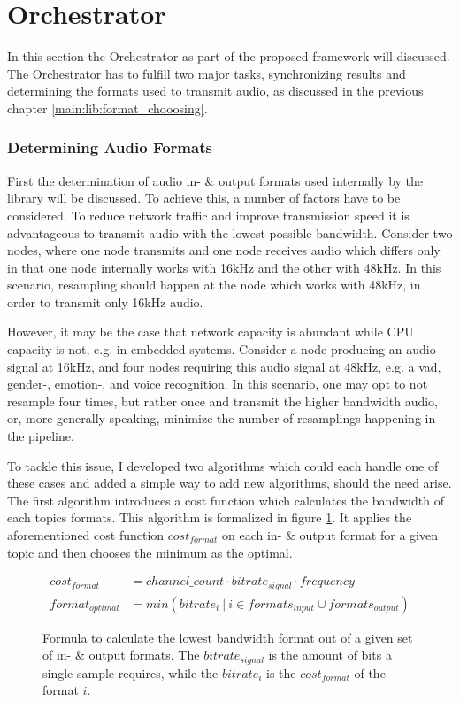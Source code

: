 


\section{Orchestrator}
\label{main:orc}
In this section the Orchestrator as part of the proposed framework will discussed.
The Orchestrator has to fulfill two major tasks, synchronizing results and determining the formats used to transmit audio, as discussed in the previous chapter \ref{main:lib:format_chooosing}.

\subsubsection{Determining Audio Formats}
First the determination of audio in- \& output formats used internally by the library will be discussed.
To achieve this, a number of factors have to be considered.
To reduce network traffic and improve transmission speed it is advantageous to transmit audio with the lowest possible bandwidth.
Consider two nodes, where one node transmits and one node receives audio which differs only in that one node internally works with 16kHz and the other with 48kHz.
In this scenario, resampling should happen at the node which works with 48kHz, in order to transmit only 16kHz audio.

However, it may be the case that network capacity is abundant while CPU capacity is not, e.g. in embedded systems.
Consider a node producing an audio signal at 16kHz, and four nodes requiring this audio signal at 48kHz, e.g. a \gls{vad}, gender-, emotion-, and voice recognition.
In this scenario, one may opt to not resample four times, but rather once and transmit the higher bandwidth audio, or, more generally speaking, minimize the number of resamplings happening in the pipeline.

To tackle this issue, I developed two algorithms which could each handle one of these cases and added a simple way to add new algorithms, should the need arise.
The first algorithm introduces a cost function which calculates the bandwidth of each topics formats.
This algorithm is formalized in figure \ref{main:orc:resampling:formula:min_traffic}.
It applies the aforementioned cost function $cost_{format}$ on each in- \& output format for a given topic and then chooses the minimum as the optimal.

\begin{figure}
	\begin{align*}
	cost_{format} &= channel\_count \cdot bitrate_{signal} \cdot frequency\\
	format_{optimal} &= min({bitrate_{i}\ |\ i \in formats_{input} \cup formats_{output}})
	\end{align*}
	\caption{Formula to calculate the lowest bandwidth format out of a given set of in- \& output formats.
		The $bitrate_{signal}$ is the amount of bits a single sample requires, while the $bitrate_{i}$ is the $cost_{format}$ of the format $i$.}
	\label{main:orc:resampling:formula:min_traffic}
\end{figure}

